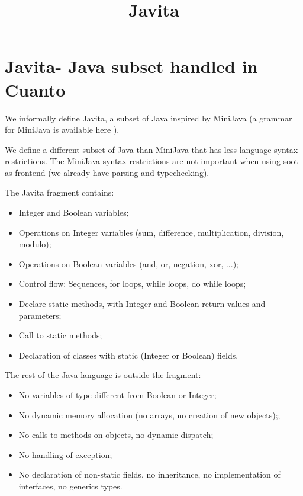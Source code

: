 \documentclass{report}
\newcommand{\minijava}{MiniJava\xspace}
\newcommand{\javita}{Javita\xspace}
\begin{document}
\title{Javita}

\maketitle



\section{\javita - Java subset handled in Cuanto}
We informally define \javita, a subset of Java inspired by \minijava
(a grammar for \minijava is available here \label{sec:minijava}).

We define a different subset of Java than \minijava that has less
language syntax restrictions. The \minijava syntax restrictions are
not important when using soot as frontend (we already have parsing and
typechecking).

The \javita fragment contains:
\begin{itemize}
\item Integer and Boolean variables;
\item Operations on Integer variables (sum, difference,
  multiplication, division, modulo);
\item Operations on Boolean variables (and, or, negation, xor, ...); 
\item Control flow: Sequences, for loops, while loops, do while loops;
\item Declare static methods, with Integer and Boolean return values
  and parameters;
\item Call to static methods;
\item Declaration of classes with static (Integer or Boolean) fields.
\end{itemize} 

The rest of the Java language is outside the fragment:
\begin{itemize}
\item No variables of type different from Boolean or Integer;
\item No dynamic memory allocation (no arrays, no creation of new objects);;
\item No calls to methods on objects, no dynamic dispatch;
\item No handling of exception;
\item No declaration of non-static fields, no inheritance, no
  implementation of interfaces, no generics types.
\end{itemize}
\end{document}
